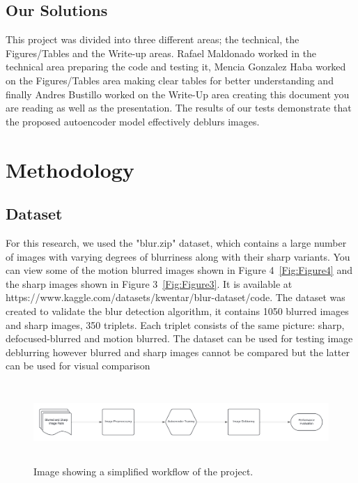 \documentclass[conference]{IEEEtran}
\begin{document}
\subsection{Our Solutions}
This project was divided into three different areas; the technical, the Figures/Tables and the Write-up areas. 
Rafael Maldonado worked in the technical area preparing the code and testing it, Mencia Gonzalez Haba worked on the Figures/Tables area making clear tables for better understanding and finally Andres Bustillo worked on the Write-Up area creating this document you are reading as well as the presentation. 
The results of our tests demonstrate that the proposed autoencoder model effectively deblurs images.

\section{Methodology}
\subsection{Dataset}
For this research, we used the "blur.zip" dataset, which contains a large number of images with varying degrees of blurriness along with their sharp variants. 
You can view some of the motion blurred images shown in Figure 4~\ref{Fig:Figure4} and the sharp images shown in Figure 3~\ref{Fig:Figure3}.
It is available at https://www.kaggle.com/datasets/kwentar/blur-dataset/code.
The dataset was created to validate the blur detection algorithm, it contains 1050 blurred images and sharp images, 350 triplets. Each triplet consists of the same picture: sharp, defocused-blurred and motion blurred.
The dataset can be used for testing image deblurring however blurred and sharp images cannot be compared but the latter can be used for visual comparison


\begin{figure}[t!]
\centering
 \includegraphics[width=\textwidth,height=3cm]{Figures/Workflow.png}
\caption{Image showing a simplified workflow of the project.}
\label{Fig:Figure1}
\end{figure}
\end{document}
